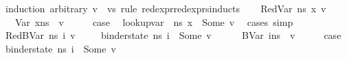 \begin{isabellebody}
%
\isadelimproof
%
\endisadelimproof
%
\isatagproof
{}\isamarkupfalse%
\ {\isacharparenleft}{\kern0pt}induction\ arbitrary{\isacharcolon}{\kern0pt}\ v{\isacharprime}{\kern0pt}\ \ vs{\isacharprime}{\kern0pt}\ rule{\isacharcolon}{\kern0pt}\ red{\isacharunderscore}{\kern0pt}expr{\isacharunderscore}{\kern0pt}red{\isacharunderscore}{\kern0pt}exprs{\isachardot}{\kern0pt}inducts{\isacharparenright}{\kern0pt}\isanewline
\ \ \isamarkupfalse%
\ {\isacharparenleft}{\kern0pt}RedVar\ n{\isacharunderscore}{\kern0pt}s\ x\ v\ {\isasymOmega}{\isacharparenright}{\kern0pt}\isanewline
\ \ \isamarkupfalse%
\ {\isachardoublequoteopen}{\isasymLambda}{\isacharcomma}{\kern0pt}{\isasymGamma}{\isacharcomma}{\kern0pt}{\isasymOmega}\ {\isasymturnstile}\ {\isasymlangle}Var\ x{\isacharcomma}{\kern0pt}n{\isacharunderscore}{\kern0pt}s{\isasymrangle}\ {\isasymDown}\ v{\isacharprime}{\kern0pt}{\isachardoublequoteclose}\isanewline
\ \ \isamarkupfalse%
\ \isamarkupfalse%
\ {\isacharquery}{\kern0pt}case\ \isamarkupfalse%
\ {\isacartoucheopen}lookup{\isacharunderscore}{\kern0pt}var\ {\isasymLambda}\ n{\isacharunderscore}{\kern0pt}s\ x\ {\isacharequal}{\kern0pt}\ Some\ v{\isacartoucheclose}\ \isamarkupfalse%
\ {\isacharparenleft}{\kern0pt}cases{\isacharsemicolon}{\kern0pt}\ simp{\isacharparenright}{\kern0pt}\isanewline
{}\isamarkupfalse%
\isanewline
\ \ \isamarkupfalse%
\ {\isacharparenleft}{\kern0pt}RedBVar\ n{\isacharunderscore}{\kern0pt}s\ i\ v\ {\isasymOmega}{\isacharparenright}{\kern0pt}\isanewline
\ \ \isamarkupfalse%
\ {\isachardoublequoteopen}binder{\isacharunderscore}{\kern0pt}state\ n{\isacharunderscore}{\kern0pt}s\ i\ {\isacharequal}{\kern0pt}\ Some\ v{\isachardoublequoteclose}\isanewline
\ \ \isamarkupfalse%
\ {\isachardoublequoteopen}{\isasymLambda}{\isacharcomma}{\kern0pt}{\isasymGamma}{\isacharcomma}{\kern0pt}{\isasymOmega}\ {\isasymturnstile}\ {\isasymlangle}BVar\ i{\isacharcomma}{\kern0pt}n{\isacharunderscore}{\kern0pt}s{\isasymrangle}\ {\isasymDown}\ v{\isacharprime}{\kern0pt}{\isachardoublequoteclose}\isanewline
\ \ \isamarkupfalse%
\ \isamarkupfalse%
\ {\isacharquery}{\kern0pt}case\ \isamarkupfalse%
\ {\isacartoucheopen}binder{\isacharunderscore}{\kern0pt}state\ n{\isacharunderscore}{\kern0pt}s\ i\ {\isacharequal}{\kern0pt}\ Some\ v{\isacartoucheclose}\ \isamarkupfalse%

\end{isabellebody}
